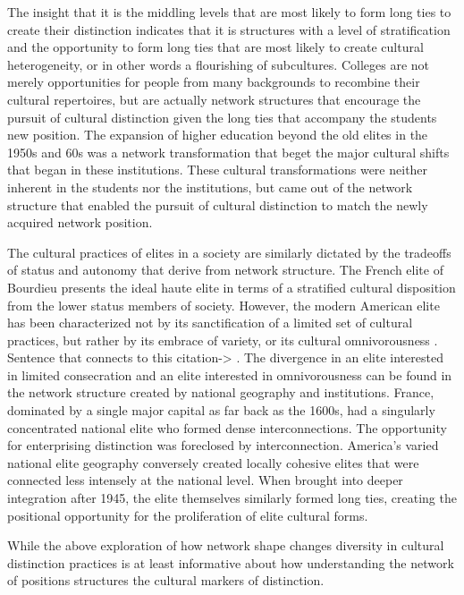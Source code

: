 \documentclass[12pt]{article}
\begin{document}
The insight that it is the middling levels that are most likely to form long ties to create their distinction indicates that it is structures with a level of stratification and the opportunity to form long ties that are most likely to create cultural heterogeneity, or in other words a flourishing of subcultures. Colleges are not merely opportunities for people from many backgrounds to recombine their cultural repertoires, but are actually network structures that encourage the pursuit of cultural distinction given the long ties that accompany the students new position. The expansion of higher education beyond the old elites in the 1950s and 60s was a network transformation that beget the major cultural shifts that began in these institutions. These cultural transformations were neither inherent in the students nor the institutions, but came out of the network structure that enabled the pursuit of cultural distinction to match the newly acquired network position.  

The cultural practices of elites in a society are similarly dictated by the tradeoffs of status and autonomy that derive from network structure. The French elite of Bourdieu presents the ideal haute elite in terms of a stratified cultural disposition from the lower status members of society. However, the modern American elite has been characterized not by its sanctification of a limited set of cultural practices, but rather by its embrace of variety, or its cultural omnivorousness \citep{bryson1996anything}. Sentence that connects to this citation-> \citep{lizardo2014omnivorousness}. The divergence in an elite interested in limited consecration and an elite interested in omnivorousness can be found in the network structure created by national geography and institutions. France, dominated by a single major capital as far back as the 1600s, had a singularly concentrated national elite who formed dense interconnections. The opportunity for enterprising distinction was foreclosed by interconnection. America's varied national elite geography conversely created locally cohesive elites that were connected less intensely at the national level. When brought into deeper integration after 1945, the elite themselves similarly formed long ties, creating the positional opportunity for the proliferation of elite cultural forms.      

While the above exploration of how network shape changes diversity in cultural distinction practices is at least informative about how understanding the network of positions structures the cultural markers of distinction. 
\end{document}
